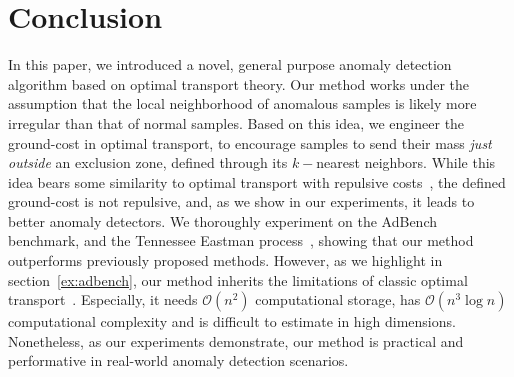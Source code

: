 \section{Conclusion}\label{sec:conclusion}

In this paper, we introduced a novel, general purpose anomaly detection algorithm based on optimal transport theory. Our method works under the assumption that the local neighborhood of anomalous samples is likely more irregular than that of normal samples. Based on this idea, we engineer the ground-cost in optimal transport, to encourage samples to send their mass \emph{just outside} an exclusion zone, defined through its $k-$nearest neighbors. While this idea bears some similarity to optimal transport with repulsive costs~\citep{di2017optimal}, the defined ground-cost is not repulsive, and, as we show in our experiments, it leads to better anomaly detectors. We thoroughly experiment on the AdBench~\citep{han2022adbench} benchmark, and the Tennessee Eastman process~\citep{downs1993plant,reinartz2021extended,montesuma2024benchmarking}, showing that our method outperforms previously proposed methods. However, as we highlight in section~\ref{ex:adbench}, our method inherits the limitations of classic optimal transport~\citep{montesuma2024recentadvancesoptimaltransport}. Especially, it needs $\mathcal{O}(n^{2})$ computational storage, has $\mathcal{O}(n^{3}\log n)$ computational complexity and is difficult to estimate in high dimensions. Nonetheless, as our experiments demonstrate, our method is practical and performative in real-world anomaly detection scenarios.

\newpage